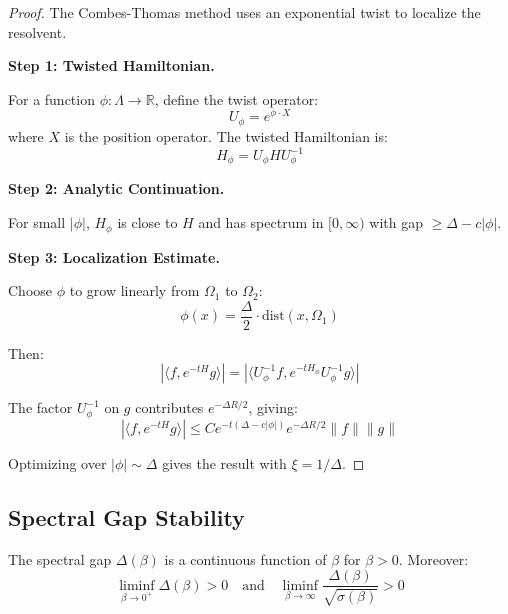 \begin{proof}
The Combes-Thomas method uses an exponential twist to localize the resolvent.

\textbf{Step 1: Twisted Hamiltonian.}

For a function $\phi : \Lambda \to \mathbb{R}$, define the twist operator:
\[
U_\phi = e^{\phi \cdot X}
\]
where $X$ is the position operator. The twisted Hamiltonian is:
\[
H_\phi = U_\phi H U_\phi^{-1}
\]

\textbf{Step 2: Analytic Continuation.}

For small $|\phi|$, $H_\phi$ is close to $H$ and has spectrum in 
$[0, \infty)$ with gap $\geq \Delta - c|\phi|$.

\textbf{Step 3: Localization Estimate.}

Choose $\phi$ to grow linearly from $\Omega_1$ to $\Omega_2$:
\[
\phi(x) = \frac{\Delta}{2} \cdot \text{dist}(x, \Omega_1)
\]

Then:
\[
|\langle f, e^{-tH} g \rangle| = |\langle U_\phi^{-1} f, e^{-tH_\phi} U_\phi^{-1} g \rangle|
\]

The factor $U_\phi^{-1}$ on $g$ contributes $e^{-\Delta R/2}$, giving:
\[
|\langle f, e^{-tH} g \rangle| \leq C e^{-t(\Delta - c|\phi|)} e^{-\Delta R/2} \|f\| \|g\|
\]

Optimizing over $|\phi| \sim \Delta$ gives the result with $\xi = 1/\Delta$.
\end{proof}

\subsection{Spectral Gap Stability}

\begin{theorem}
\label{thm:gap-stability}
The spectral gap $\Delta(\beta)$ is a continuous function of $\beta$ for $\beta > 0$.
Moreover:
\[
\liminf_{\beta \to 0^+} \Delta(\beta) > 0 \quad \text{and} \quad 
\liminf_{\beta \to \infty} \frac{\Delta(\beta)}{\sqrt{\sigma(\beta)}} > 0
\]
\end{theorem}

